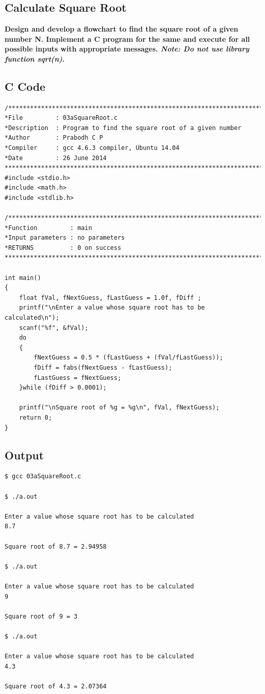 \documentclass[a4paper]{report}
\begin{document}
\chapter{}
\section{Calculate Square Root}
{\selectfont \textbf{Design and develop a flowchart to find the square root of a given number N.
Implement a C program for the same and execute for all possible inputs with
appropriate messages. \textit{Note: Do not use library function sqrt(n)}.
}}

\section*{C Code}

\begin{Verbatim}
/***************************************************************************
*File         : 03aSquareRoot.c
*Description  : Program to find the square root of a given number
*Author       : Prabodh C P
*Compiler     : gcc 4.6.3 compiler, Ubuntu 14.04
*Date         : 26 June 2014
***************************************************************************/
#include <stdio.h>
#include <math.h>
#include <stdlib.h>

/***************************************************************************
*Function         :	main
*Input parameters :	no parameters
*RETURNS          :	0 on success
***************************************************************************/

int main()
{
    float fVal, fNextGuess, fLastGuess = 1.0f, fDiff ;
    printf("\nEnter a value whose square root has to be calculated\n");
    scanf("%f", &fVal);
    do
    {
        fNextGuess = 0.5 * (fLastGuess + (fVal/fLastGuess));
        fDiff = fabs(fNextGuess - fLastGuess);
        fLastGuess = fNextGuess;
    }while (fDiff > 0.0001);

    printf("\nSquare root of %g = %g\n", fVal, fNextGuess);
    return 0;
}
\end{Verbatim}

\section*{Output}
\begin{Verbatim}
$ gcc 03aSquareRoot.c

$ ./a.out 

Enter a value whose square root has to be calculated
8.7

Square root of 8.7 = 2.94958

$ ./a.out 

Enter a value whose square root has to be calculated
9

Square root of 9 = 3

$ ./a.out 

Enter a value whose square root has to be calculated
4.3

Square root of 4.3 = 2.07364
\end{Verbatim}
\end{document}
